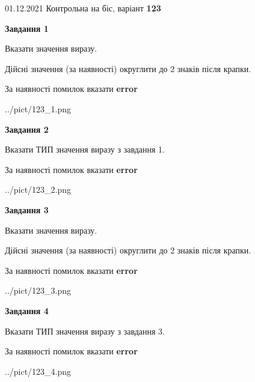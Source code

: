 \documentclass[11pt, ukrainian]{article}
\begin{document}
{01.12.2021 Контрольна на біс, варіант  \No \textbf { 123 }\par}
{
\begin {large}
{\begin {center}\textbf{Завдання 1}\end {center}}\par
Вказати значення виразу. \par
Дійсні значення (за наявності) округлити до 2 знаків після крапки. \par
За наявності помилок вказати \textbf{error}

\begin{center}
	{../pict/123_1.png}
\end{center}
\newpage

{\begin {center}\textbf{Завдання 2}\end {center}}\par
Вказати ТИП значення виразу з завдання 1. \par
За наявності помилок вказати \textbf{error}

\begin{center}
	{../pict/123_2.png}
\end{center}
\newpage

{\begin {center}\textbf{Завдання 3}\end {center}}\par
Вказати значення виразу. \par
Дійсні значення (за наявності) округлити до 2 знаків після крапки. \par
За наявності помилок вказати \textbf{error}

\begin{center}
	{../pict/123_3.png}
\end{center}
\newpage

{\begin {center}\textbf{Завдання 4}\end {center}}\par
Вказати ТИП значення виразу з завдання 3. \par
За наявності помилок вказати \textbf{error}

\begin{center}
	{../pict/123_4.png}
\end{center}
\newpage


\end{large}}
\end{document}
